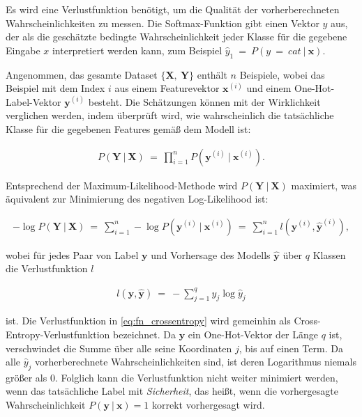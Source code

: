 Es wird eine Verlustfunktion benötigt, um die Qualität der vorherberechneten Wahrscheinlichkeiten zu messen. Die Softmax-Funktion gibt einen Vektor $\hat{y}$ aus, der als die geschätzte bedingte Wahrscheinlichkeit jeder Klasse für die gegebene Eingabe $x$ interpretiert werden kann, zum Beispiel $\hat{y}_{1}\ =\ P(y\ =\ cat\ |\ \boldsymbol{x})$.

Angenommen, das gesamte Dataset $\{\boldsymbol{X},\ \boldsymbol{Y}\}$ enthält $n$ Beispiele, wobei das Beispiel mit dem Index $i$ aus einem Featurevektor $\boldsymbol{x}^{(i)}$ und einem One-Hot-Label-Vektor $\boldsymbol{y}^{(i)}$ besteht. Die Schätzungen können mit der Wirklichkeit verglichen werden, indem überprüft wird, wie wahrscheinlich die tatsächliche Klasse für die gegebenen Features gemäß dem Modell ist:

\begin{align}
  P(\boldsymbol{Y}\ |\ \boldsymbol{X})\ =\ \prod_{i=1}^{n}P(\boldsymbol{y}^{(i)}\ |\ \boldsymbol{x}^{(i)}).
\end{align}

Entsprechend der Maximum-Likelihood-Methode wird $P(\boldsymbol{Y}\ |\ \boldsymbol{X})$ maximiert, was äquivalent zur Minimierung des negativen Log-Likelihood ist:

\begin{align}
  -\log P(\boldsymbol{Y}\ |\ \boldsymbol{X})\ =\ \sum_{i=1}^{n}-\log P(\boldsymbol{y}^{(i)}\ |\ \boldsymbol{x}^{(i)})\ =\ \sum_{i=1}^{n}l(\boldsymbol{y}^{(i)},\boldsymbol{\hat{y}}^{(i)}),
\end{align}

wobei für jedes Paar von Label $\boldsymbol{y}$ und Vorhersage des Modells $\boldsymbol{\hat{y}}$ über $q$ Klassen die Verlustfunktion $l$

\begin{align}
  \label{eq:fn_crossentropy}
  l(\boldsymbol{y}, \boldsymbol{\hat{y}})\ =\ - \sum_{j=1}^{q}y_{j}\log\hat{y}_{j}
\end{align}

ist. Die Verlustfunktion in \eqref{eq:fn_crossentropy} wird gemeinhin als Cross-Entropy-Verlustfunktion bezeichnet. Da $\boldsymbol{y}$ ein One-Hot-Vektor der Länge $q$ ist, verschwindet die Summe über alle seine Koordinaten $j$, bis auf einen Term. Da alle $\hat{y}_j$ vorherberechnete Wahrscheinlichkeiten sind, ist deren Logarithmus niemals größer als $0$. Folglich kann die Verlustfunktion nicht weiter minimiert werden, wenn das tatsächliche Label mit \textit{Sicherheit}, das heißt, wenn die vorhergesagte Wahrscheinlichkeit $P(\boldsymbol{y}\ |\ \boldsymbol{x}) = 1$ korrekt vorhergesagt wird.

